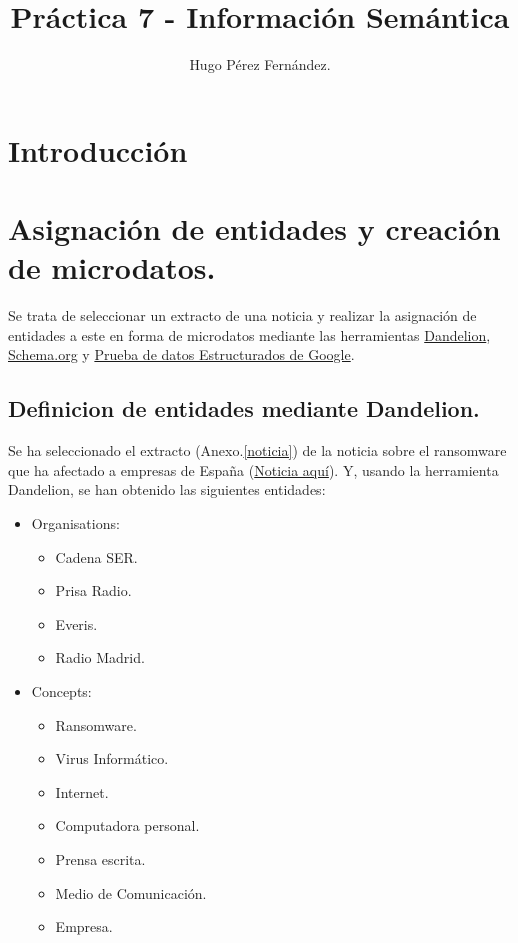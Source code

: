 \documentclass{llncs}   %
\begin{document}
\title{Práctica 7 - Información Semántica}

\author{Hugo Pérez Fernández.  
}
\maketitle              

\section{Introducción}

\section{Asignación de entidades y creación de microdatos.}

Se trata de seleccionar un extracto de una noticia y realizar la asignación de entidades a este en forma de microdatos mediante las 
herramientas \href{https://dandelion.eu/semantic-text/entity-extraction-demo/}{Dandelion}, 
\href{https://schema.org/docs/schemas.html}{Schema.org} y 
\href{https://search.google.com/structured-data/testing-tool/u/0/}{Prueba de datos Estructurados de Google}.

\subsection{Definicion de entidades mediante Dandelion.}

Se ha seleccionado el extracto (Anexo.\ref{noticia}) de la noticia sobre el ransomware que 
ha afectado a empresas de España 
(\href{https://www.elconfidencial.com/tecnologia/2019-11-04/everis-la-ser-ciberataque-ransomware_2312019/}{Noticia aquí}).
Y, usando la herramienta Dandelion, 
se han obtenido las siguientes entidades:

\begin{itemize}
    \item Organisations:
    \begin{itemize}
        \item Cadena SER.
        \item Prisa Radio.
        \item Everis.
        \item Radio Madrid.
    \end{itemize}
    \item Concepts:
    \begin{itemize}
        \item Ransomware.
        \item Virus Informático.
        \item Internet.
        \item Computadora personal.
        \item Prensa escrita.
        \item Medio de Comunicación.
        \item Empresa.
    \end{itemize}
\end{itemize}
\end{document}
